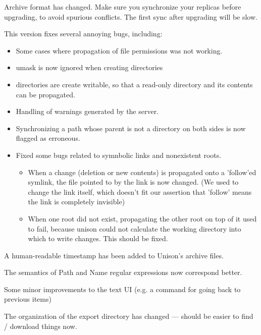 \begin{changesfromversion}{1.219}
\item \incompatible{} Archive format has changed.  Make sure you
synchronize your replicas before upgrading, to avoid spurious
conflicts.  The first sync after upgrading will be slow.

\item This version fixes several annoying bugs, including:
\begin{itemize}
\item Some cases where propagation of file permissions was not
working.
\item umask is now ignored when creating directories
\item directories are create writable, so that a read-only directory and
    its contents can be propagated.
\item Handling of warnings generated by the server.
\item Synchronizing a path whose parent is not a directory on both sides is
now flagged as erroneous.
\item Fixed some bugs related to symnbolic links and nonexistent roots.
\begin{itemize}
\item
   When a change (deletion or new contents) is propagated onto a
     'follow'ed symlink, the file pointed to by the link is now changed.
     (We used to change the link itself, which doesn't fit our assertion
     that 'follow' means the link is completely invisible)
   \item When one root did not exist, propagating the other root on top of it
     used to fail, because unison could not calculate the working directory
     into which to write changes.  This should be fixed.
\end{itemize}
\end{itemize}

\item A human-readable timestamp has been added to Unison's archive files.

\item The semantics of Path and Name regular expressions now
correspond better.

\item Some minor improvements to the text UI (e.g. a command for going
back to previous items)

\item The organization of the export directory has changed --- should
be easier to find / download things now.
\end{changesfromversion}

